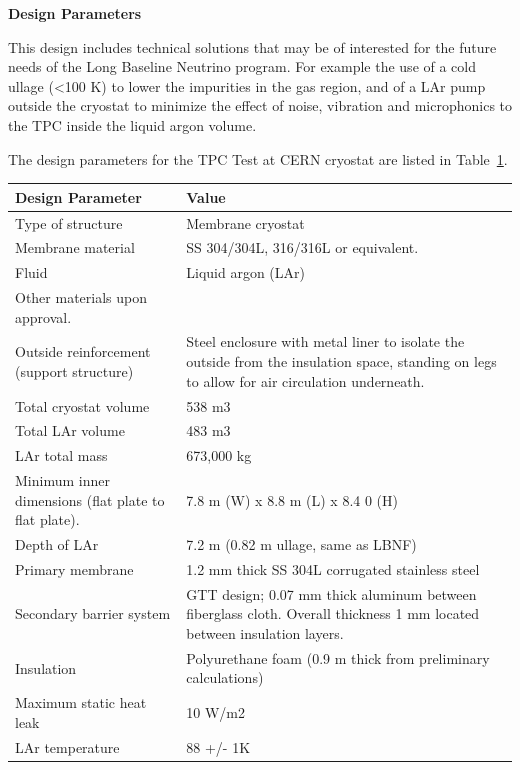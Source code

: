 \textbf{Design Parameters}

This design includes technical solutions that may be of interested for the future needs of the Long Baseline Neutrino program. For example the use of a cold ullage (\textless  100 K) to lower the impurities in the gas region, and of a LAr pump outside the cryostat to minimize the effect of noise, vibration and microphonics to the TPC inside the liquid argon volume.

The design parameters for the TPC Test at CERN cryostat are listed in Table~\ref{tbl:cryogenics-design-parameters}.

\begin{table}[htpb]
\label{tbl:cryogenics-design-parameters}
\centering
\begin{tabular}{|p{}|p{}|}
\hline
\textbf{Design Parameter} & \textbf{Value} \\ \hline
Type of structure & Membrane cryostat \\ \hline
Membrane material    &  SS 304/304L, 316/316L or equivalent. \\ \hline
Fluid & Liquid argon (LAr)  \\ \hline
Other materials upon approval.\\ \hline
 Outside reinforcement (support structure)  &  Steel enclosure with metal liner to isolate the outside from the insulation space, standing on legs to allow for air circulation underneath. \\ \hline
 Total cryostat volume  &  538 m3 \\ \hline
 Total LAr volume  &  483 m3 \\ \hline
LAr total mass   & 673,000 kg  \\ \hline
Minimum inner dimensions (flat plate to flat plate).   &  7.8 m (W) x 8.8 m (L) x 8.4 0 (H) \\ \hline
Depth of LAr   &  7.2 m (0.82 m ullage, same as LBNF) \\ \hline
Primary membrane   &   1.2 mm thick SS 304L corrugated stainless steel\\ \hline
Secondary barrier system   &  GTT design; 0.07 mm thick aluminum between fiberglass cloth. Overall thickness 1 mm located between insulation layers.  \\ \hline
 Insulation  &  Polyurethane foam (0.9 m thick from preliminary calculations) \\ \hline
Maximum static heat leak   &  10 W/m2 \\ \hline
LAr temperature   & 88 +/- 1K  \\ \hline

\end{tabular}
\end{table}
